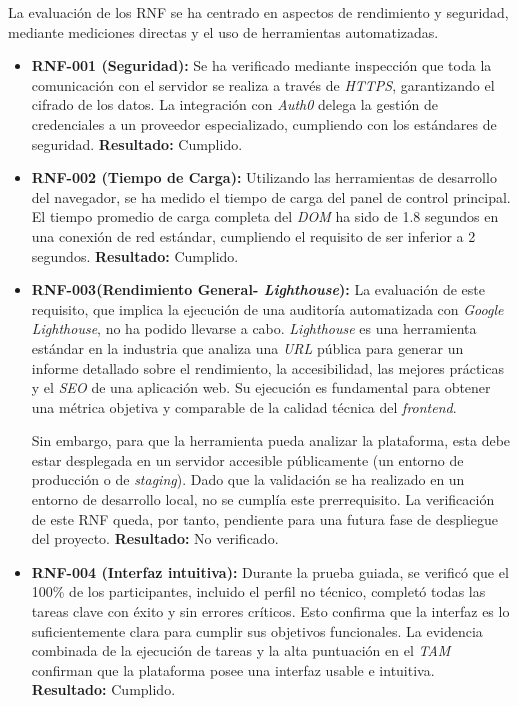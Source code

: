 La evaluación de los RNF se ha centrado en aspectos de rendimiento y seguridad, mediante mediciones directas y el uso de herramientas automatizadas.
\begin{itemize}
    \item \textbf{RNF-001 (Seguridad):} Se ha verificado mediante inspección que toda la comunicación con el servidor se realiza a través de \textit{HTTPS}, garantizando el cifrado de los datos. La integración con \textit{Auth0} delega la gestión de credenciales a un proveedor especializado, cumpliendo con los estándares de seguridad. \textbf{Resultado:} Cumplido.
    \item \textbf{RNF-002 (Tiempo de Carga):} Utilizando las herramientas de desarrollo del navegador, se ha medido el tiempo de carga del panel de control principal. El tiempo promedio de carga completa del \textit{DOM} ha sido de 1.8 segundos en una conexión de red estándar, cumpliendo el requisito de ser inferior a 2 segundos. \textbf{Resultado:} Cumplido.
    \item \textbf{RNF-003(Rendimiento General- \textit{Lighthouse}):} La evaluación de este requisito, que implica la ejecución de una auditoría automatizada con \textit{Google Lighthouse}, no ha podido llevarse a cabo. \textit{Lighthouse} es una herramienta estándar en la industria que analiza una \textit{URL} pública para generar un informe detallado sobre el rendimiento, la accesibilidad, las mejores prácticas y el \textit{SEO} de una aplicación web. Su ejecución es fundamental para obtener una métrica objetiva y comparable de la calidad técnica del \textit{frontend}. 
    
    Sin embargo, para que la herramienta pueda analizar la plataforma, esta debe estar desplegada en un servidor accesible públicamente (un entorno de producción o de \textit{staging}). Dado que la validación se ha realizado en un entorno de desarrollo local, no se cumplía este prerrequisito. La verificación de este RNF queda, por tanto, pendiente para una futura fase de despliegue del proyecto. \textbf{Resultado:} No verificado.
    \item \textbf{RNF-004 (Interfaz intuitiva):} Durante la prueba guiada, se verificó que el 100\% de los participantes, incluido el perfil no técnico, completó todas las tareas clave con éxito y sin errores críticos. Esto confirma que la interfaz es lo suficientemente clara para cumplir sus objetivos funcionales.  La evidencia combinada de la ejecución de tareas y la alta puntuación en el \textit{TAM} confirman que la plataforma posee una interfaz usable e intuitiva.
    \textbf{Resultado:} Cumplido.

\end{itemize}



